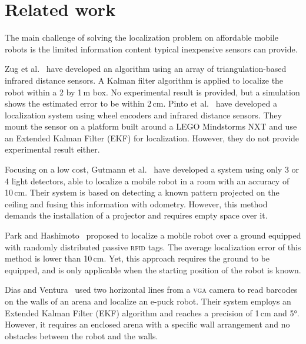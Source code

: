 \documentclass{svmult}
\begin{document}
\section{Related work}

The main challenge of solving the localization problem on affordable mobile robots is the limited information content typical inexpensive sensors can provide.

Zug et al.~\cite{zug2011design} have developed an algorithm using an array of triangulation-based infrared distance sensors.
A Kalman filter algorithm is applied to localize the robot within a 2 by 1\,m box.
No experimental result is provided, but a simulation shows the estimated error to be within 2\,cm.
Pinto et al.~\cite{pinto2012localization} have developed a localization system using wheel encoders and infrared distance sensors.
They mount the sensor on a platform built around a LEGO Mindstorms NXT and use an Extended Kalman Filter (EKF) for localization.
However, they do not provide experimental result either.

Focusing on a low cost, Gutmann et al.~\cite{gutmann2013challenges} have developed a system using only 3 or 4 light detectors, able to localize a mobile robot in a room with an accuracy of 10\,cm.
Their system is based on detecting a known pattern projected on the ceiling and fusing this information with odometry.
However, this method demands the installation of a projector and requires empty space over it.

Park and Hashimoto~\cite{park2009approach} proposed to localize a mobile robot over a ground equipped with randomly distributed passive \textsc{rfid} tags.
The average localization error of this method is lower than 10\,cm.
Yet, this approach requires the ground to be equipped, and is only applicable when the starting position of the robot is known.

Dias and Ventura~\cite{dias2013absolute} used two horizontal lines from a \textsc{vga} camera to read barcodes on the walls of an arena and localize an e-puck robot.
Their system employs an Extended Kalman Filter (EKF) algorithm and reaches a precision of 1\,cm and 5°.
However, it requires an enclosed arena with a specific wall arrangement and no obstacles between the robot and the walls.
\end{document}
